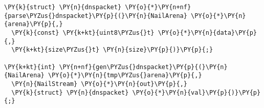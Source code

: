 \begin{Verbatim}[commandchars=\\\{\},codes={\catcode`\$=3\catcode`\^=7\catcode`\_=8}]
\PY{k}{struct} \PY{n}{dnspacket} \PY{o}{*}\PY{n+nf}{parse\PYZus{}dnspacket}\PY{p}{(}\PY{n}{NailArena} \PY{o}{*}\PY{n}{arena}\PY{p}{,}
  \PY{k}{const} \PY{k+kt}{uint8\PYZus{}t} \PY{o}{*}\PY{n}{data}\PY{p}{,}
  \PY{k+kt}{size\PYZus{}t} \PY{n}{size}\PY{p}{)}\PY{p}{;}

\PY{k+kt}{int} \PY{n+nf}{gen\PYZus{}dnspacket}\PY{p}{(}\PY{n}{NailArena} \PY{o}{*}\PY{n}{tmp\PYZus{}arena}\PY{p}{,}
  \PY{n}{NailStream} \PY{o}{*}\PY{n}{out}\PY{p}{,}
  \PY{k}{struct} \PY{n}{dnspacket} \PY{o}{*}\PY{n}{val}\PY{p}{)}\PY{p}{;}
\end{Verbatim}

